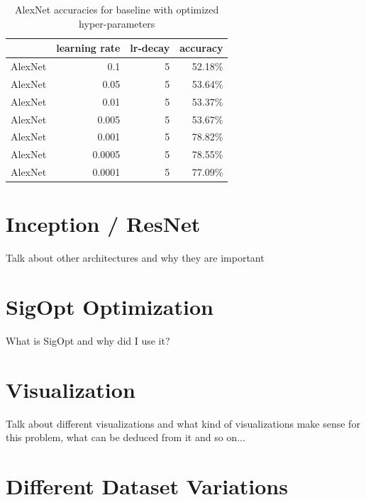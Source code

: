 \begin{table}[t] \centering
{}
\caption{AlexNet accuracies for baseline with optimized hyper-parameters}
\begin{tabular}{@{}rrrr@{}}
\toprule & learning rate & lr-decay & accuracy \\
\midrule
AlexNet        & 0.1         & 5        & 52.18\%  \\
AlexNet        & 0.05         & 5        & 53.64\%  \\
AlexNet        & 0.01         & 5        & 53.37\%  \\
AlexNet        & 0.005         & 5        & 53.67\%  \\
AlexNet        & 0.001         & 5        & 78.82\%  \\
AlexNet        & 0.0005         & 5        & 78.55\%  \\
AlexNet        & 0.0001         & 5        & 77.09\%  \\
\bottomrule
\end{tabular}
\label{tbl:AlexNetBaseline}
\end{table}


\section{Inception / ResNet}

Talk about other architectures and why they are important

\section{SigOpt Optimization}

What is SigOpt and why did I use it?

\section{Visualization}

Talk about different visualizations and what kind of visualizations make sense for this problem, what can be deduced from it and so on... 

\section{Different Dataset Variations}

